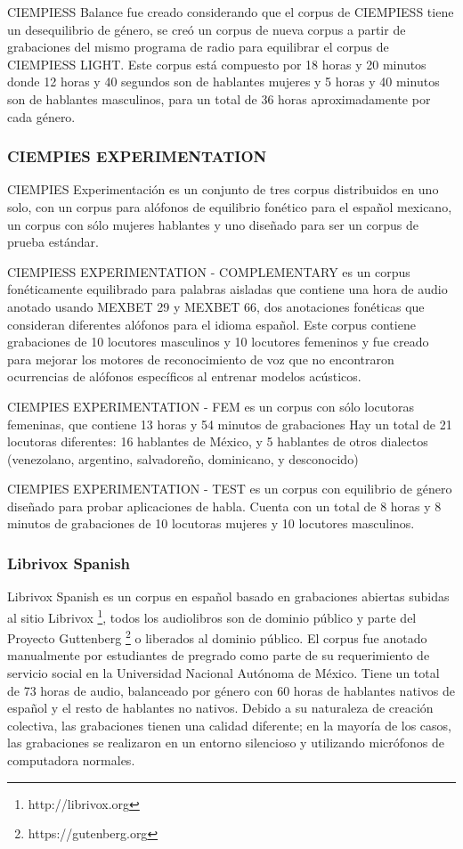 CIEMPIESS Balance \cite{CIEMPIESS-BALANCE} fue creado considerando que el corpus de CIEMPIESS tiene un desequilibrio de género, se creó un corpus de nueva corpus a partir de grabaciones del mismo programa de radio para equilibrar el corpus de CIEMPIESS LIGHT. Este corpus está compuesto por 18 horas y 20 minutos donde 12 horas y 40 segundos son de hablantes mujeres y 5 horas y 40 minutos son de hablantes masculinos, para un total de 36 horas aproximadamente por cada género.


\subsubsection{CIEMPIES EXPERIMENTATION}

CIEMPIES Experimentación \cite{CIEMPIESS-Experimentation} es un conjunto de tres corpus distribuidos en uno solo, con un corpus para alófonos de equilibrio fonético para el español mexicano, un corpus con s\'olo mujeres hablantes y uno diseñado para ser un corpus de prueba estándar.

CIEMPIESS EXPERIMENTATION - COMPLEMENTARY es un corpus fonéticamente equilibrado para palabras aisladas que contiene una hora de audio anotado usando MEXBET 29 y MEXBET 66, dos anotaciones fonéticas que consideran diferentes alófonos para el idioma español. Este corpus contiene grabaciones de 10 locutores masculinos y 10 locutores femeninos y fue creado para mejorar los motores de reconocimiento de voz que no encontraron ocurrencias de alófonos específicos al entrenar modelos acústicos.

CIEMPIES EXPERIMENTATION  - FEM es un corpus con sólo locutoras femeninas, que contiene 13 horas y 54 minutos de grabaciones Hay un total de 21 locutoras diferentes: 16 hablantes de México, y 5 hablantes de otros dialectos (venezolano, argentino, salvadoreño, dominicano, y desconocido)

CIEMPIES EXPERIMENTATION  - TEST es un corpus con equilibrio de género diseñado para probar aplicaciones de habla. Cuenta con un total de 8 horas y 8 minutos de grabaciones de 10 locutoras mujeres y 10 locutores masculinos.

\subsubsection {Librivox Spanish}

Librivox Spanish \cite{LibriVox-Spanish} es un corpus en español basado en grabaciones abiertas subidas al sitio Librivox \footnote{http://librivox.org}, todos los audiolibros son de dominio público y parte del Proyecto Guttenberg \footnote{https://gutenberg.org} o liberados al dominio público. El corpus fue anotado manualmente por estudiantes de pregrado como parte de su requerimiento de servicio social en la Universidad Nacional Autónoma de México. Tiene un total de 73 horas de audio, balanceado por género con 60 horas de hablantes nativos de español y el resto de hablantes no nativos. Debido a su naturaleza de creación colectiva, las grabaciones tienen una calidad diferente; en la mayoría de los casos, las grabaciones se realizaron en un entorno silencioso y utilizando micrófonos de computadora normales.

